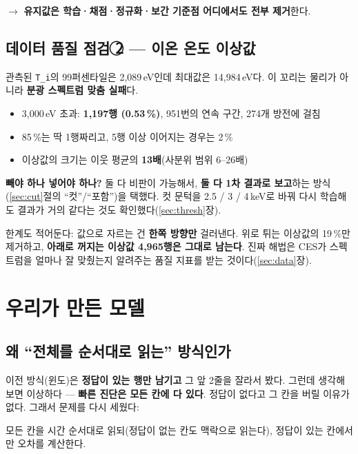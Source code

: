 \documentclass[10pt]{article}
\newcommand{\Ti}{\texttt{T\_i}}
\newenvironment{note}{\begin{snugshade}\small}{\end{snugshade}}
\begin{document}
$\rightarrow$ \textbf{유지값은 학습·채점·정규화·보간 기준점 어디에서도 전부 제거}한다.

\subsection{데이터 품질 점검 \textcircled{2} --- 이온 온도 이상값}

관측된 \Ti 의 99퍼센타일은 2{,}089\,eV인데 최대값은 14{,}984\,eV다. 이 꼬리는 물리가 아니라
\textbf{분광 스펙트럼 맞춤 실패}다.

\begin{itemize}
\item 3{,}000\,eV 초과: \textbf{1{,}197행 (0.53\,\%)}, 951번의 연속 구간, 274개 방전에 걸침
\item 85\,\%는 딱 1행짜리고, 5행 이상 이어지는 경우는 2\,\%
\item 이상값의 크기는 이웃 평균의 \textbf{13배}(사분위 범위 6--26배)
\end{itemize}

\textbf{빼야 하나 넣어야 하나?} 둘 다 비판이 가능해서, \textbf{둘 다 1차 결과로 보고}하는
방식(\ref{sec:cut}절의 ``컷''/``포함'')을 택했다. 컷 문턱을 2.5 / 3 / 4\,keV로 바꿔 다시
학습해도 결과가 거의 같다는 것도 확인했다(\ref{sec:thresh}장).

한계도 적어둔다: 값으로 자르는 건 \textbf{한쪽 방향만} 걸러낸다. 위로 튀는 이상값의
19\,\%만 제거하고, \textbf{아래로 꺼지는 이상값 4{,}965행은 그대로 남는다}. 진짜 해법은
CES가 스펙트럼을 얼마나 잘 맞췄는지 알려주는 품질 지표를 받는 것이다(\ref{sec:data}장).

\section{우리가 만든 모델}

\subsection{왜 ``전체를 순서대로 읽는'' 방식인가}

이전 방식(윈도)은 \textbf{정답이 있는 행만 남기고} 그 앞 2줄을 잘라서 봤다. 그런데 생각해
보면 이상하다 --- \textbf{빠른 진단은 모든 칸에 다 있다}. 정답이 없다고 그 칸을 버릴 이유가
없다. 그래서 문제를 다시 세웠다:

\begin{note}
모든 칸을 시간 순서대로 읽되(정답이 없는 칸도 맥락으로 읽는다), 정답이 있는 칸에서만
오차를 계산한다.
\end{note}
\end{document}
